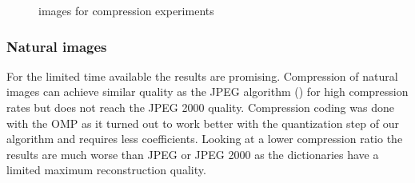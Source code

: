 \begin{figure}[h]
\hspace{5mm}
\hspace{5mm}
\hspace{5mm}
\hspace{5mm}
\caption{images for compression experiments}
\label{fig:comp_images}
\end{figure}

\newpage
\subsubsection{Natural images}

For the limited time available the results are promising. Compression of
natural images can achieve similar quality as the JPEG algorithm
() for high compression rates but does not reach the
JPEG 2000 quality. Compression coding was done with the OMP as it turned out to
work better with the quantization step of our algorithm and requires less
coefficients. Looking at a lower compression ratio the results are much worse
than JPEG or JPEG 2000 as the dictionaries have a limited maximum reconstruction
quality.

